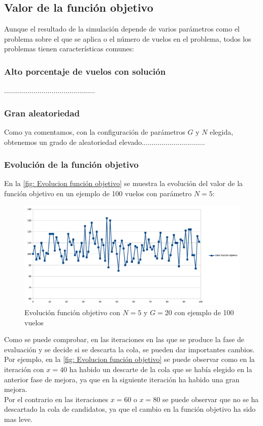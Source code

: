 \subsection{Valor de la función objetivo}
Aunque el resultado de la simulación depende de varios parámetros como el problema sobre el que se aplica o el número de vuelos en el problema, todos los problemas tienen características comunes:
\subsubsection{Alto porcentaje de vuelos con solución}
..............................................
\subsubsection{Gran aleatoriedad}
Como ya comentamos, con la configuración de parámetros $G$ y $N$ elegida, obtenemos un grado de aleatoriedad elevado................................

\subsubsection{Evolución de la función objetivo}
En la \autoref{fig: Evolucion función objetivo} se muestra la evolución del valor de la función objetivo en un ejemplo de 100 vuelos con parámetro $N=5$: 
\begin{figure}[H]
	\begin{center}
		\centering
		\includegraphics[width=1\textwidth]{./imagenes/resultados/evolucionFuncionObjetivo.png}
		\caption{Evolución función objetivo con $N=5$ y $G=20$ con ejemplo de 100 vuelos}
		\label{fig: Evolucion función objetivo}
	\end{center}
\end{figure}
Como se puede comprobar, en las iteraciones en las que se produce la fase de evaluación y se decide si se descarta la cola, se pueden dar importantes cambios. Por ejemplo, en la \autoref{fig: Evolucion función objetivo} se puede observar como en la iteración con $x=40$ ha habido un descarte de la cola que se había elegido en la anterior fase de mejora, ya que en la siguiente iteración ha habido una gran mejora.\\
Por el contrario en las iteraciones $x=60$ o $x=80$ se puede observar que no se ha descartado la cola de candidatos, ya que el cambio en la función objetivo ha sido mas leve.

